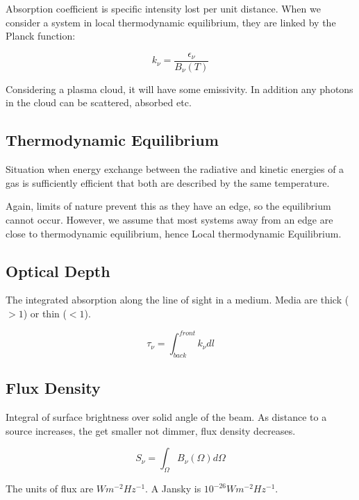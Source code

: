 \documentclass[]{article}
\begin{document}
 Absorption coefficient is specific intensity lost per unit distance. When we consider a system in local thermodynamic equilibrium, they are linked by the Planck function:
 
 \begin{equation}
 k_\nu = \frac{\epsilon_\nu}{B_\nu(T)}
 \end{equation}
 
 Considering a plasma cloud, it will have some emissivity. In addition any photons in the cloud can be scattered, absorbed etc.


\subsection{Thermodynamic Equilibrium}
Situation when energy exchange between the radiative and kinetic energies of a gas is sufficiently efficient that both are described by the same temperature.

Again, limits of nature prevent this as they have an edge, so the equilibrium cannot occur. However, we assume that most systems away from an edge are close to thermodynamic equilibrium, hence Local thermodynamic Equilibrium.

\subsection{Optical Depth}
The integrated absorption along the line of sight in a medium. Media are thick ($>1$) or thin ($<1$).

\begin{equation}
\tau_\nu = \int_{back}^{front}k_\nu dl
\end{equation}

\subsection{Flux Density}
Integral of surface brightness over solid angle of the beam. As distance to a source increases, the get smaller not dimmer, flux density decreases.

\begin{equation}
S_\nu = \int_{\Omega}B_\nu(\Omega)d\Omega
\end{equation}

The units of flux are $Wm^{-2}Hz^{-1}$. A Jansky is $10^{-26}Wm^{-2}Hz^{-1}$. 
\end{document}
